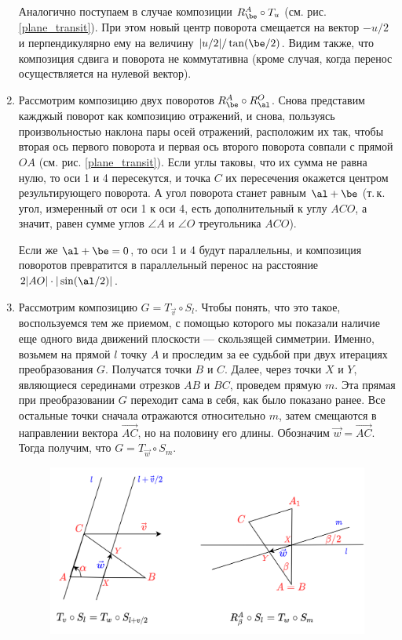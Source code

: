 \begin{enumerate}
Аналогично поступаем в случае композиции $R_\be^A\circ T_u$ (см. рис. \ref{plane_transit}). При этом новый центр поворота смещается на вектор $-u/2$ и перпендикулярно ему на величину $|u/2|/\tan(\be/2)$. Видим также, что композиция сдвига и поворота не коммутативна (кроме случая, когда перенос осуществляется на нулевой вектор).

\item Рассмотрим композицию двух поворотов $R_\be^A\circ R_\al^O$. Снова представим кажджый поворот как композицию отражений, и снова, пользуясь произвольностью наклона пары осей отражений, расположим их так, чтобы вторая ось первого поворота и первая ось второго поворота совпали с прямой $OA$ (см. рис. \ref{plane_transit}). Если углы таковы, что их сумма не равна нулю, то оси 1 и 4 пересекутся, и точка $C$ их пересечения окажется центром результирующего поворота. А угол поворота станет равным $\al+\be$ (т.\,к. угол, измеренный от оси 1 к оси 4, есть дополнительный к углу $ACO$, а значит, равен сумме углов $\angle A$ и $\angle O$ треугольника $ACO$).

Если же $\al+\be=0$, то оси 1 и 4 будут параллельны, и композиция поворотов превратится в параллельный перенос на расстояние $2|AO|\cdot|\sin(\al/2)|$.



\item Рассмотрим композицию $G=T_{\vec v}\circ S_l$. Чтобы понять, что это такое, воспользуемся тем же приемом, с помощью которого мы показали наличие еще одного вида движений плоскости --- скользящей симметрии. Именно, возьмем на прямой $l$ точку $A$ и проследим за ее судьбой при двух итерациях преобразования $G$. Получатся точки $B$ и $C$. Далее, через точки $X$ и $Y$, являющиеся серединами отрезков $AB$ и $BC$, проведем прямую $m$. Эта прямая при преобразовании $G$ переходит сама в себя, как было показано ранее. Все остальные точки сначала отражаются относительно $m$, затем смещаются в направлении вектора $\vec{AC}$, но на половину его длины. Обозначим $\vec w=\vec{AC}$. Тогда получим, что $G=T_{\vec w}\circ S_m$.

\begin{figure}[hbt!]
\begin{center}
\includegraphics[scale=0.3]{slides.png}
\end{center}\caption{}\label{slides}
\end{figure}


\end{enumerate}
